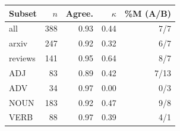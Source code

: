 \begin{tabular}{lrrrr}
\toprule
Subset & $n$ & Agree. & $\kappa$ & \%M (A/B) \\
\midrule
all & 388 & 0.93 & 0.44 & 7/7 \\
arxiv & 247 & 0.92 & 0.32 & 6/7 \\
reviews & 141 & 0.95 & 0.64 & 8/7 \\
ADJ & 83 & 0.89 & 0.42 & 7/13 \\
ADV & 34 & 0.97 & 0.00 & 0/3 \\
NOUN & 183 & 0.92 & 0.47 & 9/8 \\
VERB & 88 & 0.97 & 0.39 & 4/1 \\
\bottomrule
\end{tabular}
